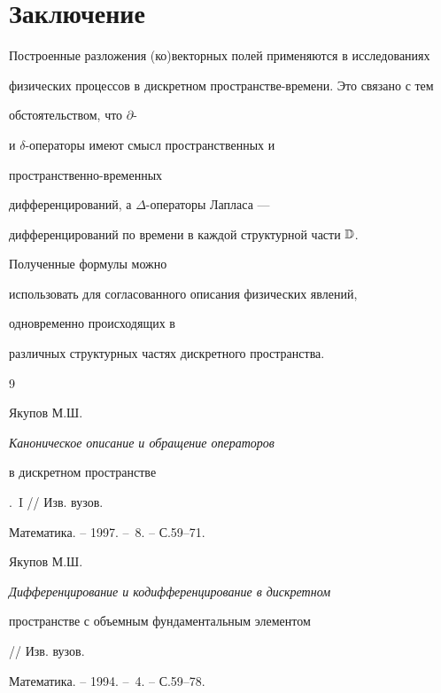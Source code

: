  


\section*{Заключение} 


 


Построенные разложения (ко)векторных полей применяются в исследованиях


физических процессов в дискретном пространстве-времени. Это связано с тем 


обстоятельством, что $\partial$-  


и $\delta$-операторы имеют смысл пространственных и 


пространственно-временных  


дифференцирований, а $\Delta$-операторы Лапласа ---


дифференцирований по времени в каждой структурной части $\Bbb D$.  


Полученные формулы можно 


использовать для согласованного описания физических явлений, 


одновременно происходящих в  


различных структурных частях дискретного пространства. 


 


 


\begin{thebibliography}{9}  


 




Якупов М.Ш. {\em Каноническое описание и обращение операторов 


в дискретном пространстве}.~I // Изв. вузов.  


Математика. -- 1997. -- \No\,8. -- С.59--71.  


 




Якупов М.Ш. {\em Дифференцирование и кодифференцирование в дискретном  


пространстве с объемным фундаментальным элементом} // Изв. вузов.  


Математика. -- 1994. -- \No\,4. -- С.59--78.  


  


\end{thebibliography}  


  


\vskip 0.5cm  


  






 


\label{end}  


  


